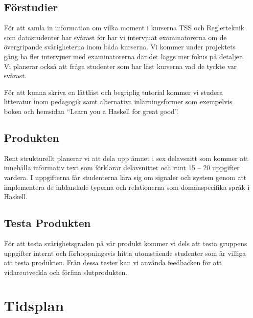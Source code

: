 \documentclass{article}
\begin{document}
\subsection{Förstudier}
För att samla in information om vilka moment i kurserna
TSS och Reglerteknik som datastudenter har svårast för har
vi intervjuat examinatorerna om de övergripande
svårigheterna inom båda kurserna.
Vi kommer under projektets gång ha fler intervjuer med
examinatorerna där det läggs mer fokus på detaljer.
Vi planerar också att fråga studenter som har läst
kurserna vad de tyckte var svårast.

För att kunna skriva en lättläst och begriplig tutorial
kommer vi studera litteratur inom pedagogik samt
alternativa inlärningsformer som exempelvis boken och
hemsidan “Learn you a Haskell for great good”.

\subsection{Produkten}
Rent strukturellt planerar vi att dela upp ämnet i
sex delavsnitt som kommer att innehålla informativ text som
förklarar delavsnittet och runt 15 -- 20 uppgifter vardera.
I uppgifterna får studenterna lära sig om signaler och
system genom att implementera de inblandade typerna
och relationerna som domänspecifika språk i Haskell.

\subsection{Testa Produkten}
För att testa svårighetsgraden på vår produkt kommer vi dels att testa
gruppens uppgifter internt och förhoppningsvis hitta utomstående
studenter som är villiga att testa produkten. Från dessa tester kan vi använda feedbacken för att vidareutveckla och förfina slutprodukten.

\section{Tidsplan}
\end{document}
